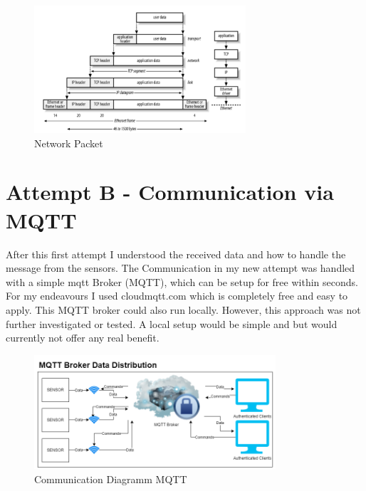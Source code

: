 \begin{figure}[ht]
  \begin{center}
\includegraphics[width=0.7\textwidth]{images/Screenshot_5.png}
  \end{center}
  \caption{Network Packet}
  \label{fig:Networkpacket}
\end{figure}
\cite{22Dissec90:online}


\section{Attempt B - Communication via MQTT}

After this first attempt I understood the received data and how to handle the message from the sensors.
The Communication in my new attempt was handled with a simple \acrshort{mqtt} Broker (\gls{MQTT}), which can be setup for free within seconds. For my endeavours I used cloudmqtt.com which is completely free and easy to apply. This MQTT broker could also run locally. However, this approach was not further investigated or tested. A local setup would be simple and but would currently not offer any real benefit.


\begin{figure}[ht]
  \begin{center}
\includegraphics[width=0.8\textwidth]{images/CommunicationDiagrammMQTT.png}
  \end{center}
  \caption{Communication Diagramm MQTT}
  \label{fig:CommunicationDiagrammMQTT}
\end{figure}

